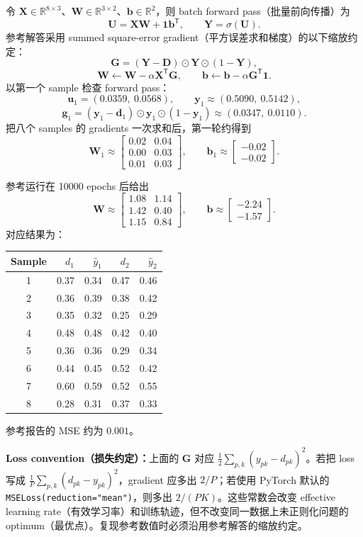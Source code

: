 \begin{checkedsolution}
令 $\bm X\in\mathbb R^{8\times3}$、$\bm W\in\mathbb R^{3\times2}$、$\bm b\in\mathbb R^2$，则 batch forward pass（批量前向传播）为
\[
  \bm U=\bm X\bm W+\bm 1\bm b^{\mathsf T},
  \qquad \bm Y=\sigma(\bm U).
\]
参考解答采用 summed square-error gradient（平方误差求和梯度）的以下缩放约定：
\[
  \bm G=(\bm Y-\bm D)\odot\bm Y\odot(1-\bm Y),
\]
\[
  \boxed{\bm W\leftarrow\bm W-\alpha\bm X^{\mathsf T}\bm G},
  \qquad
  \boxed{\bm b\leftarrow\bm b-\alpha\bm G^{\mathsf T}\bm 1}.
\]
以第一个 sample 检查 forward pass：
\[
  \bm u_1=(0.0359,\ 0.0568),\qquad
  \bm y_1\approx(0.5090,\ 0.5142),
\]
\[
  \bm g_1=(\bm y_1-\bm d_1)\odot\bm y_1\odot(1-\bm y_1)
  \approx(0.0347,\ 0.0110).
\]
把八个 samples 的 gradients 一次求和后，第一轮约得到
\[
  \bm W_1\approx
  \begin{bmatrix}
    0.02&0.04\\
    0.00&0.03\\
    0.01&0.03
  \end{bmatrix},
  \qquad
  \bm b_1\approx
  \begin{bmatrix}-0.02\\-0.02\end{bmatrix}.
\]

参考运行在 10000 epochs 后给出
\[
  \bm W\approx
  \begin{bmatrix}
    1.08&1.14\\
    1.42&0.40\\
    1.15&0.84
  \end{bmatrix},
  \qquad
  \bm b\approx
  \begin{bmatrix}-2.24\\-1.57\end{bmatrix}.
\]
对应结果为：
\begin{center}
\small
\begin{tabular}{@{}crrrr@{}}
  \toprule
  Sample & $d_1$ & $\hat y_1$ & $d_2$ & $\hat y_2$ \\
  \midrule
  1 & 0.37 & 0.34 & 0.47 & 0.46 \\
  2 & 0.36 & 0.39 & 0.38 & 0.42 \\
  3 & 0.35 & 0.32 & 0.25 & 0.29 \\
  4 & 0.48 & 0.48 & 0.42 & 0.40 \\
  5 & 0.36 & 0.36 & 0.29 & 0.34 \\
  6 & 0.44 & 0.45 & 0.52 & 0.42 \\
  7 & 0.60 & 0.59 & 0.52 & 0.55 \\
  8 & 0.28 & 0.31 & 0.37 & 0.33 \\
  \bottomrule
\end{tabular}
\end{center}
参考报告的 MSE 约为 $0.001$。

\textbf{Loss convention（损失约定）：}上面的 $\bm G$ 对应 $\tfrac12\sum_{p,k}(y_{pk}-d_{pk})^2$。若把 loss 写成 $\frac1P\sum_{p,k}(d_{pk}-y_{pk})^2$，gradient 应多出 $2/P$；若使用 PyTorch 默认的 \texttt{MSELoss(reduction="mean")}，则多出 $2/(PK)$。这些常数会改变 effective learning rate（有效学习率）和训练轨迹，但不改变同一数据上未正则化问题的 optimum（最优点）。复现参考数值时必须沿用参考解答的缩放约定。
\end{checkedsolution}

